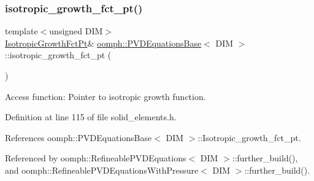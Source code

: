 \mbox{\label{classoomph_1_1PVDEquationsBase_ab80dd7e5bf9072699faca5e2da80f66a}} 
\subsubsection{\texorpdfstring{isotropic\+\_\+growth\+\_\+fct\+\_\+pt()}{isotropic\_growth\_fct\_pt()}\hspace{0.1cm}{\footnotesize\ttfamily [1/2]}}
{\footnotesize\ttfamily template$<$unsigned D\+IM$>$ \\
\hyperlink{classoomph_1_1PVDEquationsBase_a59fc7069e0330c399ff53aebb6c67729}{Isotropic\+Growth\+Fct\+Pt}\& \hyperlink{classoomph_1_1PVDEquationsBase}{oomph\+::\+P\+V\+D\+Equations\+Base}$<$ D\+IM $>$\+::isotropic\+\_\+growth\+\_\+fct\+\_\+pt (\begin{DoxyParamCaption}{ }\end{DoxyParamCaption})\hspace{0.3cm}{\ttfamily [inline]}}



Access function\+: Pointer to isotropic growth function. 



Definition at line 115 of file solid\+\_\+elements.\+h.



References oomph\+::\+P\+V\+D\+Equations\+Base$<$ D\+I\+M $>$\+::\+Isotropic\+\_\+growth\+\_\+fct\+\_\+pt.



Referenced by oomph\+::\+Refineable\+P\+V\+D\+Equations$<$ D\+I\+M $>$\+::further\+\_\+build(), and oomph\+::\+Refineable\+P\+V\+D\+Equations\+With\+Pressure$<$ D\+I\+M $>$\+::further\+\_\+build().

\mbox{\label{classoomph_1_1PVDEquationsBase_a8c4d58ce5d34f4b07886f11c67654733}} 
